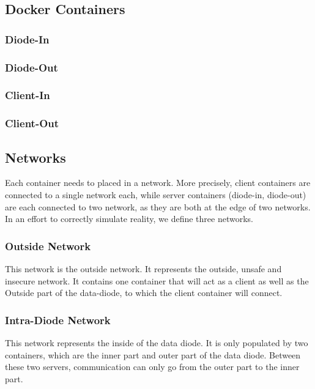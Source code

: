 \documentclass[a4paper,11pt]{article}
\begin{document}
\subsection{Docker Containers}

\subsubsection{Diode-In}

\subsubsection{Diode-Out}

\subsubsection{Client-In}

\subsubsection{Client-Out}

\subsection{Networks}
Each container needs to placed in a network. More precisely, client containers are connected to a single network each, while server containers (diode-in, diode-out) are each connected to two network, as they are both at the edge of two networks.\\

In an effort to correctly simulate reality, we define three networks.

\subsubsection{Outside Network}
This network is the outside network. It represents the outside, unsafe and insecure network. It contains one container that will act as a client as well as the Outside part of the data-diode, to which the client container will connect.

\subsubsection{Intra-Diode Network}
This network represents the inside of the data diode. It is only populated by two containers, which are the inner part and outer part of the data diode. Between these two servers, communication can only go from the outer part to the inner part.\\
\end{document}
